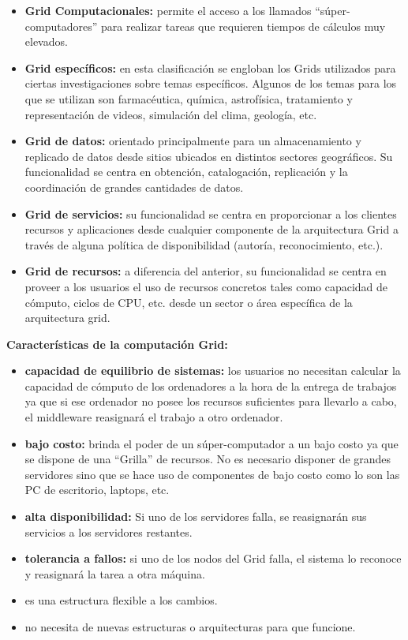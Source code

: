 \begin{itemize}

\item \textbf{Grid Computacionales:} permite el acceso a los llamados “súper-computadores” para realizar tareas que requieren tiempos de cálculos muy elevados.
  
\item \textbf{Grid específicos:} en esta clasificación se engloban los Grids utilizados para ciertas investigaciones sobre temas específicos. 
Algunos de los temas para los que se utilizan son farmacéutica, química, astrofísica, tratamiento y representación de videos, simulación del clima, geología, etc.

\item \textbf{Grid de datos:} orientado principalmente para un almacenamiento y replicado de datos desde sitios ubicados en distintos sectores geográficos. Su funcionalidad se centra en obtención, catalogación, replicación y la coordinación de grandes cantidades de datos.

\item \textbf{Grid de servicios:} su funcionalidad se centra en proporcionar a los clientes recursos y aplicaciones desde cualquier componente de 
la arquitectura Grid a través de alguna política de disponibilidad (autoría, reconocimiento, etc.).

\item \textbf{Grid de recursos:} a diferencia del anterior, su funcionalidad se centra en proveer a los usuarios el uso de recursos concretos tales como capacidad de cómputo, ciclos de CPU, etc. desde un sector o área específica de la arquitectura grid.

\end{itemize}

\vspace{0,5cm}

\textbf{Características de la computación Grid:}

\begin{itemize}
\item \textbf{capacidad de equilibrio de sistemas:} los usuarios no necesitan calcular la capacidad de cómputo de los ordenadores a la hora de la entrega de trabajos ya que si ese ordenador no posee los recursos suficientes para llevarlo a cabo, el middleware reasignará el trabajo a otro ordenador.
\item \textbf{bajo costo:} brinda el poder de un súper-computador a un bajo costo ya que se dispone de una ``Grilla'' de recursos. No es necesario disponer de grandes servidores sino que se hace uso de componentes de bajo costo como lo son las PC de escritorio, laptops, etc.
\item \textbf{alta disponibilidad:} Si uno de los servidores falla, se reasignarán sus servicios a los servidores restantes.
\item \textbf{tolerancia a fallos:} si uno de los nodos del Grid falla, el sistema lo reconoce y reasignará la tarea a otra máquina. 
\item es una estructura flexible a los cambios.
\item no necesita de nuevas estructuras o arquitecturas para que funcione.
\end{itemize}

